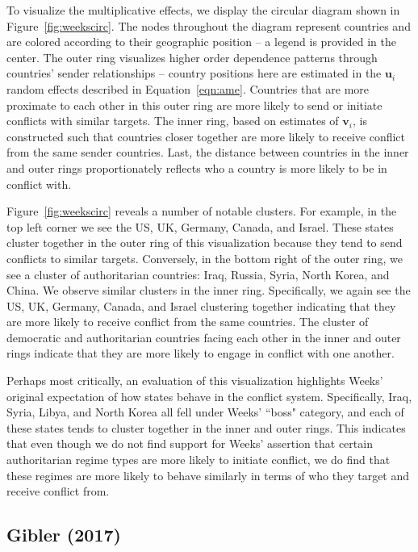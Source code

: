 To visualize the multiplicative effects, we display the circular diagram shown in Figure~\ref{fig:weekscirc}. The nodes throughout the diagram represent countries and are colored according to their geographic position -- a legend is provided in the center. The outer ring visualizes higher order dependence patterns through countries' sender relationships -- country positions here are estimated in the $\mathbf{u}_{i}$ random effects described in Equation~\ref{eqn:ame}. Countries that are more proximate to each other in this outer ring are more likely to send or initiate conflicts with similar targets. The inner ring, based on estimates of $\mathbf{v}_{i}$, is constructed such that countries closer together are more likely to receive conflict from the same sender countries. Last, the distance between countries in the inner and outer rings proportionately reflects who a country is more likely to be in conflict with. 

Figure~\ref{fig:weekscirc} reveals a number of notable clusters. For example, in the top left corner we see the US, UK, Germany, Canada, and Israel. These states cluster together in the outer ring of this visualization because they tend to send conflicts to similar targets. Conversely, in the bottom right of the outer ring, we see a cluster of authoritarian countries: Iraq, Russia, Syria, North Korea, and China. We observe similar clusters in the inner ring. Specifically, we again see the US, UK, Germany, Canada, and Israel clustering together indicating that they are more likely to receive conflict from the same countries.  The  cluster of democratic and authoritarian countries facing each other in the inner and outer rings indicate that they are more likely to engage in conflict with one another. 

Perhaps most critically, an evaluation of this visualization highlights Weeks' original expectation of how states behave in the conflict system.  Specifically, Iraq, Syria, Libya, and North Korea all fell under Weeks' ``boss" category, and each of these states tends to cluster together in the inner and outer rings. This indicates that even though we do not find support for Weeks' assertion that certain authoritarian regime types are more likely to initiate conflict, we do find that these regimes are more likely to behave similarly in terms of who they target and receive conflict from. 

\subsection{Gibler (2017)}

